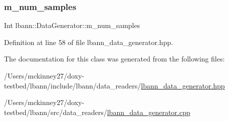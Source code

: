 \subsubsection{\texorpdfstring{m\+\_\+num\+\_\+samples}{m\_num\_samples}}
{\footnotesize\ttfamily Int lbann\+::\+Data\+Generator\+::m\+\_\+num\+\_\+samples\hspace{0.3cm}{\ttfamily [private]}}



Definition at line 58 of file lbann\+\_\+data\+\_\+generator.\+hpp.



The documentation for this class was generated from the following files\+:\begin{DoxyCompactItemize}
\item 
/\+Users/mckinney27/doxy-\/testbed/lbann/include/lbann/data\+\_\+readers/\hyperlink{lbann__data__generator_8hpp}{lbann\+\_\+data\+\_\+generator.\+hpp}\item 
/\+Users/mckinney27/doxy-\/testbed/lbann/src/data\+\_\+readers/\hyperlink{lbann__data__generator_8cpp}{lbann\+\_\+data\+\_\+generator.\+cpp}\end{DoxyCompactItemize}
